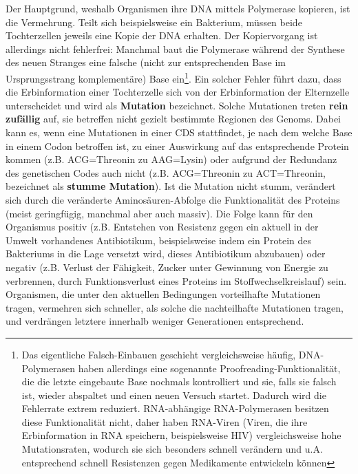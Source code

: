 Der Hauptgrund, weshalb Organismen ihre DNA mittels Polymerase kopieren, ist die Vermehrung. Teilt sich beispielsweise ein Bakterium, müssen beide Tochterzellen jeweils eine Kopie der DNA erhalten. Der Kopiervorgang ist allerdings nicht fehlerfrei: Manchmal baut die Polymerase während der Synthese des neuen Stranges eine falsche (nicht zur entsprechenden Base im Ursprungsstrang komplementäre) Base ein\footnote{Das eigentliche Falsch-Einbauen geschieht vergleichsweise häufig, DNA-Polymerasen haben allerdings eine sogenannte Proofreading-Funktionalität, die die letzte eingebaute Base nochmals kontrolliert und sie, falls sie falsch ist, wieder abspaltet und einen neuen Versuch startet. Dadurch wird die Fehlerrate extrem reduziert. RNA-abhängige RNA-Polymerasen besitzen diese Funktionalität nicht, daher haben RNA-Viren (Viren, die ihre Erbinformation in RNA speichern, beispielsweise HIV) vergleichsweise hohe Mutationsraten, wodurch sie sich besonders schnell verändern und u.A. entsprechend schnell Resistenzen gegen Medikamente entwickeln können}. Ein solcher Fehler führt dazu, dass die Erbinformation einer Tochterzelle sich von der Erbinformation der Elternzelle unterscheidet und wird als \textbf{Mutation} bezeichnet. Solche Mutationen treten \textbf{rein zufällig} auf, sie betreffen nicht gezielt bestimmte Regionen des Genoms. Dabei kann es, wenn eine Mutationen in einer CDS stattfindet, je nach dem welche Base in einem Codon betroffen ist, zu einer Auswirkung auf das entsprechende Protein kommen (z.B. ACG=Threonin zu AAG=Lysin) oder aufgrund der Redundanz des genetischen Codes auch nicht (z.B. ACG=Threonin zu ACT=Threonin, bezeichnet als \textbf{stumme Mutation}). Ist die Mutation nicht stumm, verändert sich durch die veränderte Aminosäuren-Abfolge die Funktionalität des Proteins (meist geringfügig, manchmal aber auch massiv). Die Folge kann für den Organismus positiv (z.B. Entstehen von Resistenz gegen ein aktuell in der Umwelt vorhandenes Antibiotikum, beispielsweise indem ein Protein des Bakteriums in die Lage versetzt wird, dieses Antibiotikum abzubauen) oder negativ (z.B. Verlust der Fähigkeit, Zucker unter Gewinnung von Energie zu verbrennen, durch Funktionsverlust eines Proteins im Stoffwechselkreislauf) sein. Organismen, die unter den aktuellen Bedingungen vorteilhafte Mutationen tragen, vermehren sich schneller, als solche die nachteilhafte Mutationen tragen, und verdrängen letztere innerhalb weniger Generationen entsprechend.

